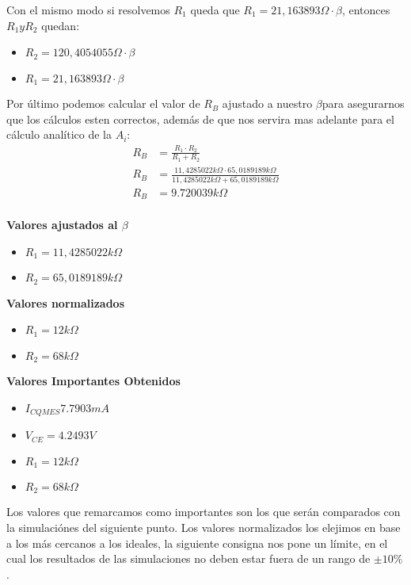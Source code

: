 \begin{multicols}{2}
			\sangria{} Con el mismo modo si resolvemos $R_1$ queda que $R_1=21,163893\Omega \cdot \beta$, entonces $R_1 y R_2$ quedan:
            \begin{itemize}[nosep]
				\item $R_2 = 120,4054055\Omega \cdot \beta$
				\item $R_1 = 21,163893\Omega \cdot \beta$
            \end{itemize}


            \sangria{}Por último podemos calcular el valor de $R_B$ ajustado a nuestro $\beta$para asegurarnos que los cálculos esten correctos, además de que nos servira mas adelante para el cálculo analítico de la $A_i$:
            \begin{align*}
            R_B &= \frac{R_1 \cdot R_2}{R_1+R_2}\\
            R_B &= \frac{11,4285022 k\Omega \cdot 65,0189189 k\Omega}{11,4285022 k\Omega+ 65,0189189 k\Omega}\\
            R_B &= 9.720039 k\Omega\\
            \end{align*}


            \textbf{Valores ajustados al $\beta$}
            \begin{itemize}[nosep]
				\item $R_1 = 11,4285022 k\Omega$
				\item $R_2 = 65,0189189 k\Omega$
			\end{itemize}


            \textbf{Valores normalizados}
            \begin{itemize}[nosep]
				\item $R_1 = 12 k\Omega$
				\item $R_2 = 68 k\Omega$
			\end{itemize}

			\textbf{Valores Importantes Obtenidos}
            \begin{itemize}[nosep]
            	\item $I_{CQMES} 7.7903mA $
            	\item $V_{CE} = 4.2493V$
				\item $R_1 = 12 k\Omega$
				\item $R_2 = 68 k\Omega$
			\end{itemize}

			\sangria{}Los valores que remarcamos como importantes son los que serán comparados con la simulaciónes del siguiente punto.
			\sangria{}Los valores normalizados los elejimos en base a los más cercanos a los ideales, la siguiente consigna nos pone un límite, en el cual los resultados de las simulaciones no deben estar fuera de un rango de $\pm 10\%$.


\end{multicols}
